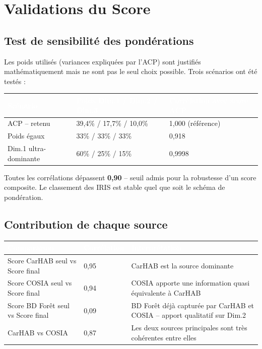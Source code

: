 \documentclass[12pt,a4paper]{report}
\begin{document}
\section{Validations du Score}

\subsection{Test de sensibilité des pondérations}

Les poids utilisés (variances expliquées par l'ACP) sont justifiés mathématiquement mais ne sont pas le seul choix possible. Trois scénarios ont été testés :

\vspace{0.3cm}
\begin{tabularx}{\textwidth}{L{3.5cm} L{4cm} X}
  \toprule
  \textcolor{white}{\textbf{Scénario}} &
  \textcolor{white}{\textbf{Poids Dim.1 / Dim.2 / Dim.3}} &
  \textcolor{white}{\textbf{Corrélation avec score ACP}} \\
  \midrule
  ACP -- retenu & 39,4\% / 17,7\% / 10,0\% & 1,000 (référence) \\
  Poids égaux & 33\% / 33\% / 33\% & 0,918 \\
  Dim.1 ultra-dominante & 60\% / 25\% / 15\% & 0,9998 \\
  \bottomrule
\end{tabularx}

\vspace{0.3cm}
Toutes les corrélations dépassent \textbf{0,90} -- seuil admis pour la robustesse d'un score composite. Le classement des IRIS est stable quel que soit le schéma de pondération.

\subsection{Contribution de chaque source}

\begin{tabularx}{\textwidth}{L{4.5cm} L{1.8cm} X}
  \toprule
  \textcolor{white}{\textbf{Comparaison}} &
  \textcolor{white}{\textbf{Corrélation}} &
  \textcolor{white}{\textbf{Interprétation}} \\
  \midrule
  Score CarHAB seul vs Score final & 0,95 & CarHAB est la source dominante \\
  Score COSIA seul vs Score final & 0,94 & COSIA apporte une information quasi équivalente à CarHAB \\
  Score BD Forêt seul vs Score final & 0,09 & BD Forêt déjà capturée par CarHAB et COSIA -- apport qualitatif sur Dim.2 \\
  CarHAB vs COSIA & 0,87 & Les deux sources principales sont très cohérentes entre elles \\
  \bottomrule
\end{tabularx}
\end{document}
